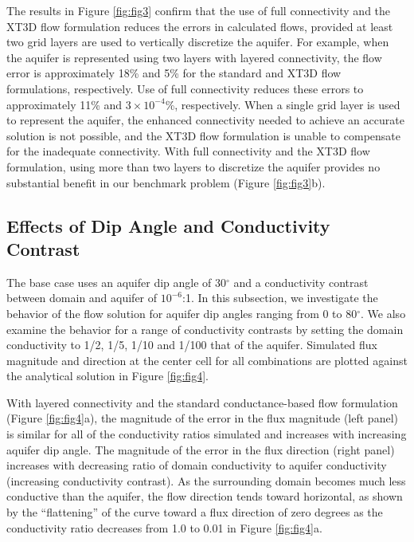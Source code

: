 \documentclass{article}
\begin{document}
The results in Figure \ref{fig:fig3} confirm that the use of full connectivity and the XT3D flow formulation reduces the errors in calculated flows, provided at least two grid layers are used to vertically discretize the aquifer. For example, when the aquifer is represented using two layers with layered connectivity, the flow error is approximately 18\% and 5\% for the standard and XT3D flow formulations, respectively. Use of full connectivity reduces these errors to approximately 11\% and $3 \times 10^{-4}$\%, respectively. When a single grid layer is used to represent the aquifer, the enhanced connectivity needed to achieve an accurate solution is not possible, and the XT3D flow formulation is unable to compensate for the inadequate connectivity. With full connectivity and the XT3D flow formulation, using more than two layers to discretize the aquifer provides no substantial benefit in our benchmark problem (Figure \ref{fig:fig3}b).

\subsection*{Effects of Dip Angle and Conductivity Contrast}

The base case uses an aquifer dip angle of 30$^{\circ}$ and a conductivity contrast between domain and aquifer of $10^{-6}$:1. In this subsection, we investigate the behavior of the flow solution for aquifer dip angles ranging from 0 to 80$^{\circ}$. We also examine the behavior for a range of conductivity contrasts by setting the domain conductivity to 1/2, 1/5, 1/10 and 1/100 that of the aquifer. Simulated flux magnitude and direction at the center cell for all combinations are plotted against the analytical solution in Figure \ref{fig:fig4}. 

With layered connectivity and the standard conductance-based flow formulation (Figure \ref{fig:fig4}a), the magnitude of the error in the flux magnitude (left panel) is similar for all of the conductivity ratios simulated and increases with increasing aquifer dip angle. The magnitude of the error in the flux direction (right panel) increases with decreasing ratio of domain conductivity to aquifer conductivity (increasing conductivity contrast). As the surrounding domain becomes much less conductive than the aquifer, the flow direction tends toward horizontal, as shown by the ``flattening'' of the curve toward a flux direction of zero degrees as the conductivity ratio decreases from 1.0 to 0.01 in Figure \ref{fig:fig4}a.
\end{document}
